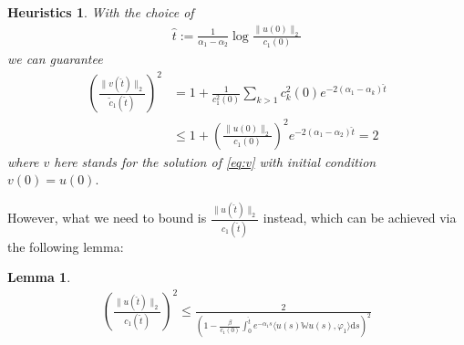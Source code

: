 \documentclass{article}
\renewcommand{\d}{\mathrm{d}}
\newcommand{\W}{\mathbb{W}}
\newcommand{\1}[1]{{\mathds{1}}_{\left\{#1\right\}}}
\newtheorem{lemma}{Lemma}
\newtheorem{heuristics}{Heuristics}
\begin{document}
\begin{heuristics}
With the choice of
\begin{align}
	\label{eq:t_hat}
	\hat{t}:= \frac{1}{\alpha_1-\alpha_2}\log \frac{\| u(0)\|_2}{c_1(0)}
\end{align}
we can guarantee
\begin{align*}
	\left(\frac{\|v(\hat{t}) \|_2}{\tilde{c}_1(\hat{t})} \right)^2&=1+\frac{1}{c_1^2(0)}\sum_{k>1}c_k^2(0)e^{-2(\alpha_1-\alpha_k)\hat{t}} \\
	& \leq 1+\left( \frac{\|u(0) \|_2}{c_1(0)}\right)^2e^{-2(\alpha_1-\alpha_2)\hat{t}}=2
\end{align*}
where $v$ here stands for the solution of \eqref{eq:v} with initial condition $v(0)=u(0).$ 
\end{heuristics}


However, what we need to bound is $\frac{\|u(\hat{t}) \|_2}{c_1(\hat{t})}$ instead, which can be achieved via the following lemma:
\begin{lemma}
\label{l:M_t_hat}
\begin{align}
\label{eq:M_t_hat}
\left(\frac{\|u(\hat{t}) \|_2}{c_1(\hat{t})} \right)^2 \leq \frac{2}{\left(1-\frac{\beta}{c_1(0)}\int_{0}^{\hat{t}}e^{-\alpha_1 s} \langle u(s)\W u(s), \varphi_1 \rangle \d s \right)^2}
\end{align}
\end{lemma}
\end{document}
